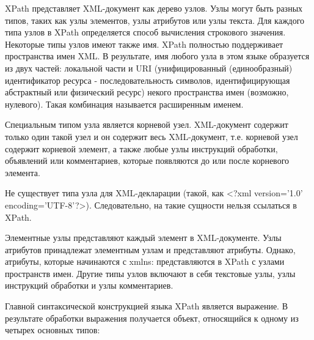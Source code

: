 \documentclass[12pt,a4paper,oneside]{article} %
\begin{document}
XPath представляет XML-документ как дерево узлов. Узлы могут быть \linebreak
разных типов, таких как узлы элементов, узлы атрибутов или узлы \linebreak
текста. Для каждого типа узлов в XPath определяется способ вычисления \linebreak
строкового значения. Некоторые типы узлов имеют также имя. XPath \linebreak
полностью поддерживает пространства имен XML. В результате, имя любого \linebreak
узла в этом языке образуется из двух частей: локальной части и URI \linebreak
(унифицированный (единообразный) идентификатор ресурса - \linebreak
последовательность символов, идентифицирующая абстрактный или \linebreak
физический ресурс) некого пространства имен (возможно, нулевого). \linebreak
Такая комбинация называется расширенным именем.

Специальным типом узла является корневой узел. XML-документ \linebreak
содержит только один такой узел и он содержит весь XML-документ, \linebreak
т.е. корневой узел содержит корневой элемент, а также любые узлы \linebreak
инструкций обработки, объявлений или комментариев, которые \linebreak
появляются до или после корневого элемента.

Не существует типа узла для XML-декларации (такой, \linebreak
как <?xml version='1.0' encoding='UTF-8'?>). Следовательно, на \linebreak
такие сущности нельзя ссылаться в XPath.

Элементные узлы представляют каждый элемент в XML-документе. Узлы \linebreak
атрибутов принадлежат элементным узлам и представляют атрибуты. \linebreak
Однако, атрибуты, которые начинаются с xmlns: представляются в \linebreak
XPath с узлами пространств имен. Другие типы узлов включают в себя \linebreak
текстовые узлы, узлы инструкций обработки и узлы комментариев.

Главной синтаксической конструкцией языка XPath является выражение. \linebreak
В результате обработки выражения получается объект, относящийся к \linebreak
одному из четырех основных типов:
\end{document}
